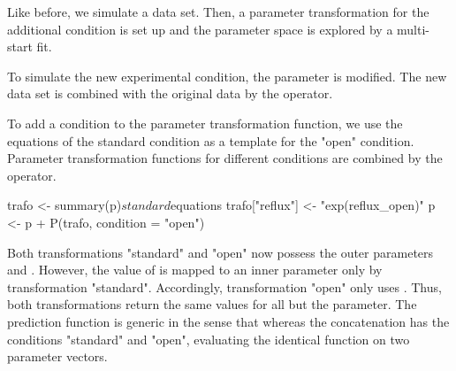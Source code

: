 \documentclass[article]{jss}
\begin{document}
Like before, we simulate a data set. Then, a parameter transformation for the additional condition is set up and the parameter space is explored by a multi-start fit.

To simulate the new experimental condition, the  parameter is modified. The new data set is combined with the original data by the  operator.

\begin{CodeChunk}
\end{CodeChunk}

To add a condition to the parameter transformation function, we use the equations of the standard condition as a template for the "open" condition. Parameter transformation functions for different conditions are combined by the  operator.

\begin{CodeChunk}
\begin{CodeInput}
trafo <- summary(p)$standard$equations
trafo["reflux"] <- "exp(reflux_open)"
p <- p + P(trafo, condition = "open")
\end{CodeInput}
\end{CodeChunk}

Both transformations "standard" and "open" now possess the outer parameters  and . However, the value of  is mapped to an inner parameter only by transformation "standard". Accordingly, transformation "open" only uses . 
Thus, both transformations return the same values for all but the  parameter. The prediction function  is generic in the sense that  whereas the concatenation  has the conditions "standard" and "open", evaluating the identical function  on two parameter vectors.
\end{document}
